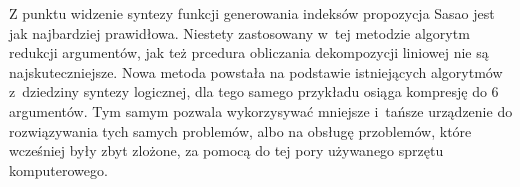 Z punktu widzenie syntezy funkcji generowania indeksów propozycja Sasao jest jak najbardziej prawidłowa.
Niestety zastosowany w~tej metodzie algorytm redukcji argumentów,
jak też prcedura obliczania dekompozycji liniowej nie są najskuteczniejsze.
Nowa metoda powstała na podstawie istniejących algorytmów z~dziedziny syntezy logicznej,
dla tego samego przykładu osiąga kompresję do 6 argumentów.
Tym samym pozwala wykorzysywać mniejsze i~tańsze urządzenie do rozwiązywania tych samych problemów,
albo na obsługę przoblemów, które wcześniej były zbyt zlożone,
za pomocą do tej pory używanego sprzętu komputerowego.






